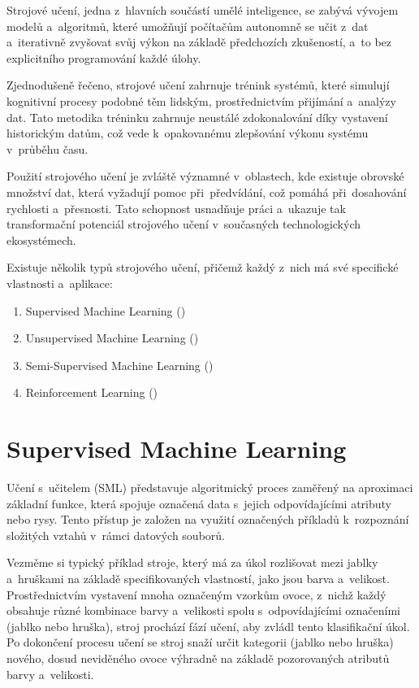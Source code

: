 Strojové učení, jedna z~hlavních součástí umělé inteligence, se zabývá vývojem modelů a~algoritmů, které umožňují počítačům autonomně se učit z~dat a~iterativně zvyšovat svůj výkon na základě předchozích zkušeností, a~to bez explicitního programování každé úlohy.

Zjednodušeně řečeno, strojové učení zahrnuje trénink systémů, které simulují kognitivní procesy podobné těm lidským, prostřednictvím přijímání a~analýzy dat. Tato metodika tréninku zahrnuje neustálé zdokonalování díky vystavení historickým datům, což vede k~opakovanému zlepšování výkonu systému v~průběhu času.

Použití strojového učení je zvláště významné v~oblastech, kde existuje obrovské množství dat, která vyžadují pomoc při~předvídání, což pomáhá při~dosahování rychlosti a~přesnosti. Tato schopnost usnadňuje práci a~ukazuje tak transformační potenciál strojového učení v~současných technologických ekosystémech.

Existuje několik typů strojového učení, přičemž každý z~nich má své specifické vlastnosti a~aplikace:
\begin{enumerate}
	\item Supervised Machine Learning ()
	\item Unsupervised Machine Learning ()
	\item Semi-Supervised Machine Learning ()		
	\item Reinforcement Learning ()
\end{enumerate}

\newpage

\section{Supervised Machine Learning}
Učení s~učitelem (SML)\cite{Russellc1995} představuje algoritmický proces zaměřený na aproximaci základní funkce, která spojuje označená data s~jejich odpovídajícími atributy nebo rysy. Tento přístup je založen na využití označených příkladů k~rozpoznání složitých vztahů v~rámci datových souborů.

Vezměme si typický příklad stroje, který má za úkol rozlišovat mezi jablky a~hruškami na základě specifikovaných vlastností, jako jsou barva a~velikost. Prostřednictvím vystavení mnoha označeným vzorkům ovoce, z~nichž každý obsahuje různé kombinace barvy a~velikosti spolu s~odpovídajícími označeními (jablko nebo hruška), stroj prochází fází učení, aby zvládl tento klasifikační úkol. Po dokončení procesu učení se stroj snaží určit kategorii (jablko nebo hruška) nového, dosud neviděného ovoce výhradně na základě pozorovaných atributů barvy a~velikosti.

